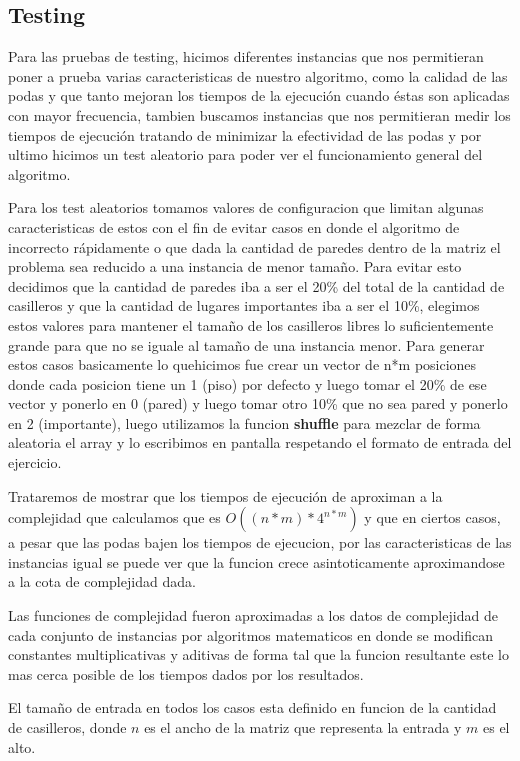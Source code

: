 \subsection{Testing}
Para las pruebas de testing, hicimos diferentes instancias que nos permitieran poner a prueba varias caracteristicas de nuestro algoritmo, como la calidad de las podas y que tanto mejoran los tiempos de la ejecución cuando éstas son aplicadas con mayor frecuencia, tambien buscamos instancias que nos permitieran medir los tiempos de ejecución tratando de minimizar la efectividad de las podas y por ultimo hicimos un test aleatorio para poder ver el funcionamiento general del algoritmo.

Para los test aleatorios tomamos valores de configuracion que limitan algunas caracteristicas de estos con el fin de evitar casos en donde el algoritmo de incorrecto rápidamente o que dada la cantidad de paredes dentro de la matriz el problema sea reducido a una instancia de menor tamaño. Para evitar esto decidimos que la cantidad de paredes iba a ser el 20\% del total de la cantidad de casilleros y que la cantidad de lugares importantes iba a ser el 10\%, elegimos estos valores para mantener el tamaño de los casilleros libres lo suficientemente grande para que no se iguale al tamaño de una instancia menor. Para generar estos casos basicamente lo quehicimos fue crear un vector de n*m posiciones donde cada posicion tiene un 1 (piso) por defecto y luego tomar el 20\% de ese vector y ponerlo en 0 (pared) y luego tomar otro 10\% que no sea pared y ponerlo en 2 (importante), luego utilizamos la funcion \textbf{shuffle} para mezclar de forma aleatoria el array y lo escribimos en pantalla respetando el formato de entrada del ejercicio.

Trataremos de mostrar que los tiempos de ejecución de aproximan a la complejidad que calculamos que es $O((n*m)*4^{n*m})$ y que en ciertos casos, a pesar que las podas bajen los tiempos de ejecucion, por las caracteristicas de las instancias igual se puede ver que la funcion crece asintoticamente aproximandose a la cota de complejidad dada.

Las funciones de complejidad fueron aproximadas a los datos de complejidad de cada conjunto de instancias por algoritmos matematicos en donde se modifican constantes multiplicativas y aditivas de forma tal que la funcion resultante este lo mas cerca posible de los tiempos dados por los resultados.

El tamaño de entrada en todos los casos esta definido en funcion de la cantidad de casilleros, donde $n$ es el ancho de la matriz que representa la entrada y $m$ es el alto.

